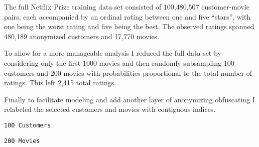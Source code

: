 \documentclass[
  letterpaper,
  DIV=11,
  numbers=noendperiod]{scrartcl}
\newenvironment{Shaded}{\begin{snugshade}}{\end{snugshade}}
\newcommand{\FunctionTok}[1]{\textcolor[rgb]{0.28,0.35,0.67}{#1}}
\newcommand{\NormalTok}[1]{\textcolor[rgb]{0.00,0.23,0.31}{#1}}
\newcommand{\OtherTok}[1]{\textcolor[rgb]{0.00,0.23,0.31}{#1}}
\newcommand{\SpecialCharTok}[1]{\textcolor[rgb]{0.37,0.37,0.37}{#1}}
\newcommand{\StringTok}[1]{\textcolor[rgb]{0.13,0.47,0.30}{#1}}
\begin{document}
The full Netflix Prize training data set consisted of 100,480,507
customer-movie pairs, each accompanied by an ordinal rating between one
and five ``stars'', with one being the worst rating and five being the
best. The observed ratings spanned 480,189 anonymized customers and
17,770 movies.

To allow for a more manageable analysis I reduced the full data set by
considering only the first 1000 movies and then randomly subsampling 100
customers and 200 movies with probabilities proportional to the total
number of ratings. This left 2,415 total ratings.

Finally to facilitate modeling and add another layer of anonymizing
obfuscating I relabeled the selected customers and movies with
contiguous indices.

\begin{Shaded}
\end{Shaded}

\begin{verbatim}
100 Customers
\end{verbatim}

\begin{Shaded}
\end{Shaded}

\begin{verbatim}
200 Movies
\end{verbatim}

\begin{Shaded}
\end{Shaded}
\end{document}
